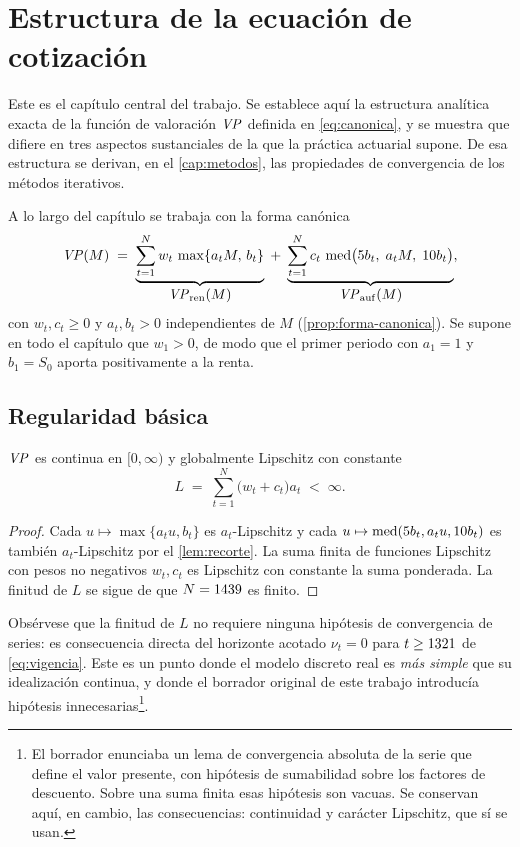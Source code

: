 \chapter{Estructura de la ecuación de cotización}
\label{cap:estructura}

Este es el capítulo central del trabajo. Se establece aquí la estructura analítica
exacta de la función de valoración $\mathit{VP}$ definida en \cref{eq:canonica}, y se
muestra que difiere en tres aspectos sustanciales de la que la práctica actuarial
supone. De esa estructura se derivan, en el \cref{cap:metodos}, las propiedades de
convergencia de los métodos iterativos.

A lo largo del capítulo se trabaja con la forma canónica
\begin{equation}
\label{eq:canonica-rep}
  \mathit{VP}(M)\;=\;\underbrace{\sum_{t=1}^{N} w_t\,\max\{a_tM,\,b_t\}}_{\textstyle \mathit{VP}_{\mathrm{ren}}(M)}
            \;+\;\underbrace{\sum_{t=1}^{N} c_t\,\operatorname{med}\bigl(5b_t,\;a_tM,\;10b_t\bigr)}_{\textstyle \mathit{VP}_{\mathrm{auf}}(M)},
\end{equation}
con $w_t,c_t\ge0$ y $a_t,b_t>0$ independientes de $M$
(\cref{prop:forma-canonica}). Se supone en todo el capítulo que $w_1>0$, de modo que el primer periodo con $a_1=1$ y $b_1=S_0$ aporta positivamente a la renta.

\section{Regularidad básica}

\begin{proposition}
\label{prop:lipschitz}
$\mathit{VP}$ es continua en $[0,\infty)$ y globalmente Lipschitz con constante
\[
  L \;=\; \sum_{t=1}^{N}\bigl(w_t+c_t\bigr)a_t \;<\;\infty .
\]
\end{proposition}
\begin{proof}
Cada $u\mapsto\max\{a_tu,b_t\}$ es $a_t$-Lipschitz y cada
$u\mapsto\operatorname{med}(5b_t,a_tu,10b_t)$ es también $a_t$-Lipschitz por el
\cref{lem:recorte}. La suma finita de funciones Lipschitz con pesos no negativos
$w_t,c_t$ es Lipschitz con constante la suma ponderada. La finitud de $L$ se sigue
de que $N=1439$ es finito.
\end{proof}

Obsérvese que la finitud de $L$ no requiere ninguna hipótesis de convergencia de
series: es consecuencia directa del horizonte acotado
$\nu_t=0$ para $t\ge1321$ de \cref{eq:vigencia}. Este es un punto
donde el modelo discreto real es \emph{más simple} que su idealización continua, y
donde el borrador original de este trabajo introducía hipótesis innecesarias\footnote{El borrador enunciaba un lema de convergencia absoluta de la serie que define el valor presente, con hipótesis de sumabilidad sobre los factores de descuento. Sobre una suma finita esas hipótesis son vacuas. Se conservan aquí, en cambio, las consecuencias: continuidad y carácter Lipschitz, que sí se usan.}.

